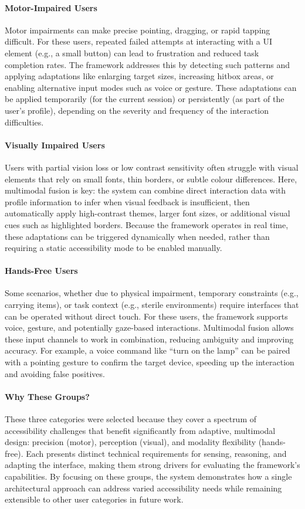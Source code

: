 \documentclass[openany]{book}
\begin{document}
\paragraph{Motor-Impaired Users}
Motor impairments can make precise pointing, dragging, or rapid tapping difficult. For these users, repeated failed attempts at interacting with a UI element (e.g., a small button) can lead to frustration and reduced task completion rates. The framework addresses this by detecting such patterns and applying adaptations like enlarging target sizes, increasing hitbox areas, or enabling alternative input modes such as voice or gesture. These adaptations can be applied temporarily (for the current session) or persistently (as part of the user’s profile), depending on the severity and frequency of the interaction difficulties.

\paragraph{Visually Impaired Users}
Users with partial vision loss or low contrast sensitivity often struggle with visual elements that rely on small fonts, thin borders, or subtle colour differences. Here, multimodal fusion is key: the system can combine direct interaction data with profile information to infer when visual feedback is insufficient, then automatically apply high-contrast themes, larger font sizes, or additional visual cues such as highlighted borders. Because the framework operates in real time, these adaptations can be triggered dynamically when needed, rather than requiring a static accessibility mode to be enabled manually.

\paragraph{Hands-Free Users}
Some scenarios, whether due to physical impairment, temporary constraints (e.g., carrying items), or task context (e.g., sterile environments) require interfaces that can be operated without direct touch. For these users, the framework supports voice, gesture, and potentially gaze-based interactions. Multimodal fusion allows these input channels to work in combination, reducing ambiguity and improving accuracy. For example, a voice command like “turn on the lamp” can be paired with a pointing gesture to confirm the target device, speeding up the interaction and avoiding false positives.
    
\paragraph{Why These Groups?}
These three categories were selected because they cover a spectrum of accessibility challenges that benefit significantly from adaptive, multimodal design: precision (motor), perception (visual), and modality flexibility (hands-free). Each presents distinct technical requirements for sensing, reasoning, and adapting the interface, making them strong drivers for evaluating the framework’s capabilities. By focusing on these groups, the system demonstrates how a single architectural approach can address varied accessibility needs while remaining extensible to other user categories in future work.
\end{document}
